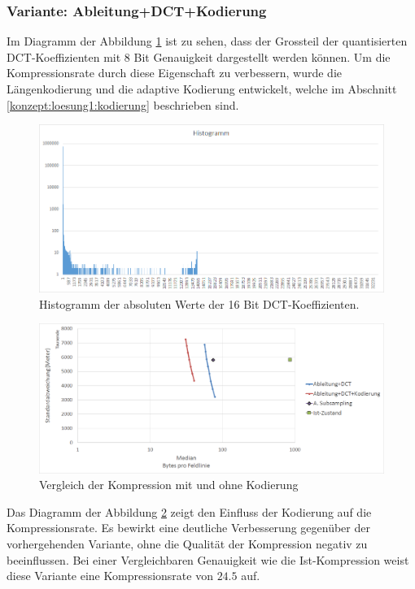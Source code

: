 \subsubsection{Variante: Ableitung+DCT+Kodierung} \label{resultate:loesung1:ableitung_dct_kodierung}
Im Diagramm der Abbildung \ref{resultate:loesung1:dct:histogramm} ist zu sehen, dass der Grossteil der quantisierten DCT-Koeffizienten mit 8 Bit Genauigkeit dargestellt werden können. Um die Kompressionsrate durch diese Eigenschaft zu verbessern, wurde die Längenkodierung und die adaptive Kodierung entwickelt, welche im Abschnitt \ref{konzept:loesung1:kodierung} beschrieben sind.
\begin{figure}[!htbp]
	\center
	\includegraphics[width=1\textwidth,keepaspectratio]{./pictures/resultate/loesung1/loesung1-6/histo.png}
	\caption{Histogramm der absoluten Werte der 16 Bit DCT-Koeffizienten.}
	\label{resultate:loesung1:dct:histogramm}
\end{figure}

\begin{figure}[!htbp]
	\center
	\includegraphics[width=1\textwidth,keepaspectratio]{./pictures/resultate/loesung1/loesung1-6/loesung1_6.png}
	\caption{Vergleich der Kompression mit und ohne Kodierung}
	\label{resultate:loesung1:dct:kodierung}
\end{figure}
Das Diagramm der Abbildung \ref{resultate:loesung1:dct:kodierung} zeigt den Einfluss der Kodierung auf die Kompressionsrate. Es bewirkt eine deutliche Verbesserung gegenüber der vorhergehenden Variante, ohne die Qualität der Kompression negativ zu beeinflussen. Bei einer Vergleichbaren Genauigkeit wie die Ist-Kompression weist diese Variante eine Kompressionsrate von $24.5$ auf.

